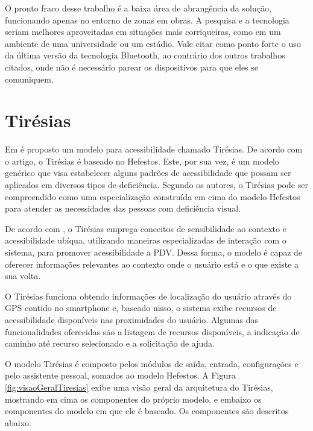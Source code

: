 \documentclass[english,brazilian]{UNISINOSmonografia}
\begin{document}
O pronto fraco desse trabalho é a baixa área de abrangência da solução, funcionando apenas no entorno de zonas em obras.
A pesquisa e a tecnologia seriam melhores aproveitadas em situações mais corriqueiras, como em um ambiente de uma universidade ou um estádio. Vale citar como ponto forte o uso da última versão da tecnologia Bluetooth, ao contrário dos outros trabalhos citados, onde não é necessário parear os dispositivos para que eles se comuniquem.

	\section{Tirésias}
Em  é proposto um modelo para acessibilidade chamado Tirésias. De acordo com o artigo, o Tirésias é baseado no Hefestos. Este, por sua vez, é um modelo genérico que visa estabelecer alguns padrões de acessibilidade que possam ser aplicados em diversos tipos de deficiência. Segundo os autores, o Tirésias pode ser compreendido como uma especialização construída em cima do modelo Hefestos para atender as necessidades das pessoas com deficiência visual. 

De acordo com , o Tirésias emprega conceitos de sensibilidade ao contexto e acessibilidade ubíqua, utilizando maneiras especializadas de interação com o sistema, para promover acessibilidade a PDV. Dessa forma, o modelo é capaz de oferecer informações relevantes ao contexto onde o usuário está e o que existe a sua volta.

O Tirésias funciona obtendo informações de localização do usuário através do GPS contido no smartphone e, baseado nisso, o sistema exibe recursos de acessibilidade disponíveis nas proximidades do usuário. Algumas das funcionalidades oferecidas são a listagem de recursos disponíveis, a indicação de caminho até recurso selecionado e a solicitação de ajuda.

O modelo Tirésias é composto pelos módulos de saída, entrada, configurações e pelo assistente pessoal, somados ao modelo Hefestos. A Figura \ref{fig:visaoGeralTiresias} exibe uma visão geral da arquitetura do Tirésias, mostrando em cima os componentes do próprio modelo, e embaixo os componentes do modelo em que ele é baseado. Os componentes são descritos abaixo.
\end{document}
